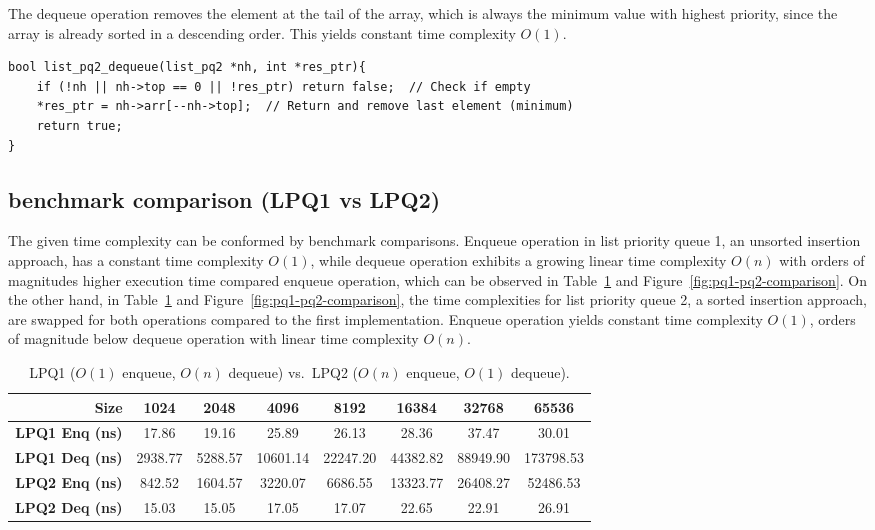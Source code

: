\documentclass[a4paper,11pt]{article}
\begin{document}
The dequeue operation removes the element at the tail of the array, which is always the minimum value with highest priority, since the array is already sorted in a descending order. This yields constant time complexity $O(1)$.

\begin{verbatim}
bool list_pq2_dequeue(list_pq2 *nh, int *res_ptr){
    if (!nh || nh->top == 0 || !res_ptr) return false;  // Check if empty
    *res_ptr = nh->arr[--nh->top];  // Return and remove last element (minimum)
    return true;
}
\end{verbatim}

\subsection*{benchmark comparison (LPQ1 vs LPQ2)}

The given time complexity can be conformed by benchmark comparisons. Enqueue operation in list priority queue 1, an unsorted insertion approach, has a constant time complexity $O(1)$, while dequeue operation exhibits a growing linear time complexity $O(n)$ with orders of magnitudes higher execution time compared enqueue operation, which can be observed in Table~\ref{tab:pq1-pq2} and Figure~\ref{fig:pq1-pq2-comparison}. On the other hand, in Table~\ref{tab:pq1-pq2} and Figure~\ref{fig:pq1-pq2-comparison}, the time complexities for list priority queue 2, a sorted insertion approach, are swapped for both operations compared to the first implementation. Enqueue operation yields constant time complexity $O(1)$, orders of magnitude below dequeue operation with linear time complexity $O(n)$.

\begin{table}[h!]
\centering
\begin{tabular}{rccccccc}
\toprule
\textbf{Size}
    & 1024 & 2048 & 4096 & 8192 & 16384 & 32768 & 65536 \\
\midrule
\textbf{LPQ1 Enq (ns)}
    & 17.86 & 19.16 & 25.89 & 26.13 & 28.36 & 37.47 & 30.01 \\
\textbf{LPQ1 Deq (ns)}
    & 2938.77 & 5288.57 & 10601.14 & 22247.20 & 44382.82 & 88949.90 & 173798.53 \\
\hline
\textbf{LPQ2 Enq (ns)}
    & 842.52 & 1604.57 & 3220.07 & 6686.55 & 13323.77 & 26408.27 & 52486.53 \\
\textbf{LPQ2 Deq (ns)}
    & 15.03 & 15.05 & 17.05 & 17.07 & 22.65 & 22.91 & 26.91 \\
\bottomrule
\end{tabular}
\caption{LPQ1 ($O(1)$ enqueue, $O(n)$ dequeue) vs.\ LPQ2 ($O(n)$ enqueue, $O(1)$ dequeue).}
\label{tab:pq1-pq2}
\end{table}
\end{document}
